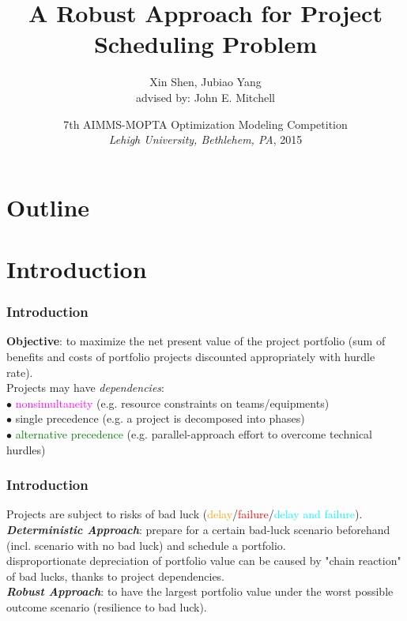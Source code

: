 \documentclass{beamer}
\title[Robust Scheduling]{A Robust Approach for Project Scheduling Problem}
\author[Shen, Yang]{Xin Shen, Jubiao Yang\\{\small advised by: John E. Mitchell}}
\institute[RPI]{ 
Rensselaer Polytechnic Institute  \\
Troy,  NY  12180}
\date[MOPTA 2015]{7th AIMMS-MOPTA Optimization Modeling Competition\\\textit{Lehigh University, Bethlehem, PA}, 2015}
\newcommand{\torange}{\textcolor{orange}}
\newcommand{\tred}{\textcolor{red}}
\newcommand{\tmag}{\textcolor{magenta}}
\newcommand{\tgreen}{\textcolor{green}}
\newcommand{\tcyan}{\textcolor{cyan}}
\newcommand{\tcam}{\textcolor{blue!40}}
\begin{document}
	

	\begin{frame}
		\titlepage
	\end{frame}

	\section*{Outline} 
		\begin{frame}[allowframebreaks]
			\tableofcontents 
		\end{frame}

	\section{Introduction}
		\begin{frame}
			\frametitle{Introduction}
			\textbf{Objective}: to maximize the net present value of the project portfolio (sum of benefits and costs of portfolio projects discounted appropriately with hurdle rate).\\
			\bigskip
			Projects may have \textit{dependencies}:\\
			\smallskip
			$\bullet$ \tmag{nonsimultaneity} (e.g. resource constraints on teams/equipments)\\
			\smallskip
			$\bullet$ \tcam{single precedence} (e.g. a project is decomposed into phases)\\
			\smallskip
			$\bullet$ \tgreen{alternative precedence} (e.g. parallel-approach effort to overcome technical hurdles)
		\end{frame}
		
		\begin{frame}
			\frametitle{Introduction}
			Projects are subject to risks of bad luck (\torange{delay}/\tred{failure}/\tcyan{delay and failure}).\\
			\bigskip
			\textbf{\textit{Deterministic Approach}}: prepare for a certain bad-luck scenario beforehand (incl. scenario with no bad luck) and schedule a portfolio.\\
			\smallskip
			disproportionate depreciation of portfolio value can be caused by "chain reaction" of bad lucks, thanks to project dependencies.\\
			\bigskip
			\textbf{\textit{Robust Approach}}: to have the largest portfolio value under the worst possible outcome scenario (resilience to bad luck).
		\end{frame}
\end{document}
